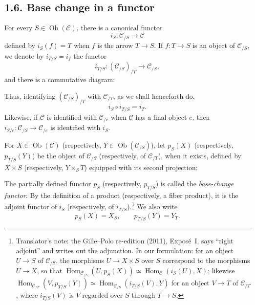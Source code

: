 
\subsection*{1.6. Base change in a functor}

For every \(S\in\operatorname{Ob}(\mathscr C)\), there is a canonical functor
\[
  i_S:\mathscr C_{/S}\longrightarrow\mathscr C
\]
defined by \(i_S(f)=T\) when \(f\) is the arrow \(T\to S\). If
\(f:T\to S\) is an object of \(\mathscr C_{/S}\), we denote by
\(i_{T/S}=i_f\) the functor
\[
  i_{T/S}:(\mathscr C_{/S})_{/T}\longrightarrow\mathscr C_{/S},
\]
and there is a commutative diagram:

\begin{center}
  
\end{center}

Thus, identifying \((\mathscr C_{/S})_{/T}\) with \(\mathscr C_{/T}\), as
we shall henceforth do,
\[
  i_S\circ i_{T/S}=i_T.
\]
Likewise, if \(\mathscr C\) is identified with \(\mathscr C_{/e}\) when
\(\mathscr C\) has a final object \(e\), then
\(i_{S/e}:\mathscr C_{/S}\to\mathscr C_{/e}\) is identified with \(i_S\).

For \(X\in\operatorname{Ob}(\mathscr C)\) (respectively,
\(Y\in\operatorname{Ob}(\mathscr C_{/S})\)), let \(p_S(X)\)
(respectively, \(p_{T/S}(Y)\)) be the object of \(\mathscr C_{/S}\)
(respectively, of \(\mathscr C_{/T}\)), when it exists, defined by
\(X\times S\) (respectively, \(Y\times_S T\)) equipped with its second
projection:

\begin{center}
  
\end{center}

The partially defined functor \(p_S\) (respectively, \(p_{T/S}\)) is called
the \emph{base-change functor}. By the definition of a product
(respectively, a fiber product), it is the adjoint functor of \(i_S\)
(respectively, of \(i_{T/S}\)).\footnote{Translator's note: the Gille--Polo re-edition (2011), Exposé~I, says ``right
adjoint'' and writes out the adjunction. In our formulation: for an object
\(U\to S\) of \(\mathscr C_{/S}\), the morphisms \(U\to X\times S\) over
\(S\) correspond to the morphisms \(U\to X\), so that
\(\operatorname{Hom}_{\mathscr C_{/S}}(U,p_S(X))\simeq
\operatorname{Hom}_{\mathscr C}(i_S(U),X)\); likewise
\(\operatorname{Hom}_{\mathscr C_{/T}}(V,p_{T/S}(Y))\simeq
\operatorname{Hom}_{\mathscr C_{/S}}(i_{T/S}(V),Y)\) for an object \(V\to T\)
of \(\mathscr C_{/T}\), where \(i_{T/S}(V)\) is \(V\) regarded over \(S\)
through \(T\to S\).}
We also write
\[
  p_S(X)=X_S,
  \qquad
  p_{T/S}(Y)=Y_T.
\]

